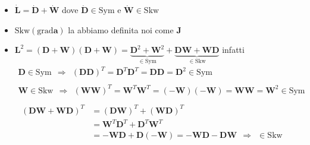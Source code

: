 \documentclass[10pt,a4paper,twoside]{book}
\begin{document}
\begin{itemize}
\item $\dot{\mathbf{L}} =\dot{\mathbf{D}} +\dot{\mathbf{W}}$ dove $\dot{\mathbf{D}} \in \mathrm{Sym}$ e $\dot{\mathbf{W}} \in \mathrm{Skw}$
\item $\mathrm{Skw}(\mathrm{grad}\mathbf{a})$ la abbiamo definita noi come $\mathbf{J}$
\item $\mathbf{L}^{2} =(\mathbf{D} +\mathbf{W})(\mathbf{D} +\mathbf{W}) =\underbrace{\mathbf{D}^{2} +\mathbf{W}^{2}}_{\in \mathrm{Sym}} +\underbrace{\mathbf{DW} +\mathbf{WD}}_{\in \mathrm{Skw}}$ infatti\begin{gather*}
\mathbf{D} \in \mathrm{Sym} \ \ \Rightarrow \ \ (\mathbf{DD})^{T} =\mathbf{D}^{T}\mathbf{D}^{T} =\mathbf{DD} =\mathbf{D}^{2} \in \mathrm{Sym}\\
\\
\mathbf{W} \in \mathrm{Skw} \ \ \Rightarrow \ \ (\mathbf{WW})^{T} =\mathbf{W}^{T}\mathbf{W}^{T} =( -\mathbf{W})( -\mathbf{W}) =\mathbf{WW} =\mathbf{W}^{2} \in \mathrm{Sym}\\
\\
\begin{aligned}
(\mathbf{DW} +\mathbf{WD})^{T} & =(\mathbf{DW})^{T} +(\mathbf{WD})^{T}\\
 & =\mathbf{W}^{T}\mathbf{D}^{T} +\mathbf{D}^{T}\mathbf{W}^{T}\\
 & =-\mathbf{WD} +\mathbf{D}( -\mathbf{W}) =-\mathbf{WD} -\mathbf{DW} \ \ \Rightarrow \ \ \in \mathrm{Skw}
\end{aligned}
\end{gather*}
\end{itemize}
\end{document}
